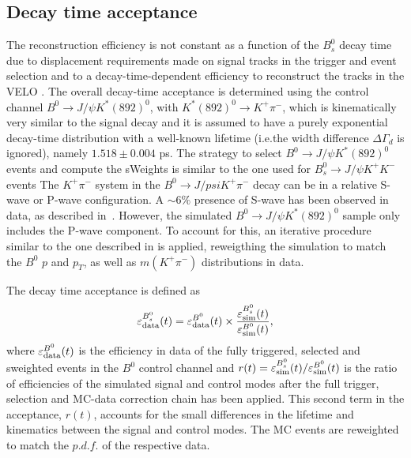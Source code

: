 \subsection{Decay time acceptance} 
The reconstruction efficiency is not constant as a function of the $B^0_s$ decay time due to displacement requirements made on signal tracks in the trigger and event selection and to a decay-time-dependent efficiency to reconstruct the tracks in the VELO \cite{LHCb-PAPER-2013-065}. The overall decay-time acceptance is determined using the control channel $B^0 \to J/\psi K^{*}(892)^0$,
with $K^{*}(892)^0 \to K^+\pi^-$, which is kinematically very similar to the signal decay and it is assumed to have a purely exponential decay-time distribution with a well-known lifetime (i.e.the width difference $\Delta \Gamma_d$ is ignored), namely $1.518\pm 0.004$ ps\cite{HFLAV2017}.
The strategy to select $B^0 \to J/\psi K^{*}(892)^0$ events and compute the sWeights is similar to the one used for $B_s^0 \rightarrow J/\psi K^+ K^-$ events
The $K^+\pi^-$ system in the $B^0 \rightarrow J/psi K^+\pi^-$ decay can be in a relative S-wave or P-wave configuration. A $\sim6\%$ presence of S-wave has been observed in data, as described in~\cite{LHCb-PAPER-2013-023}. However, the simulated $B^0 \rightarrow J/\psi K^{*}(892)^0$ sample only includes the P-wave component. To account for this, an iterative procedure similar to the one described in \red{\ref{subsec:AngAcc}} is applied, reweigthing the simulation to match the $B^0$ $p$ and $p_T$, as well as $m(K^+\pi^-)$ distributions in data. 

The decay time acceptance is defined as
\begin{equation}
	\varepsilon_{\rm data}^{B_s^0}(t) = \varepsilon_{\rm data}^{B^0}(t) \times \frac{\varepsilon_{\rm sim}^{B_s^0}(t)}{\varepsilon_{\rm sim}^{B^0}(t)},
\label{eq:timeacc}
\end{equation}
where $\varepsilon_{\rm data}^{B^0}(t)$ is the efficiency in data of the fully triggered, selected and sweighted events in the $B^0$ control channel and $r(t)=\varepsilon_{\rm sim}^{B_s^0}(t)/\varepsilon_{\rm sim}^{B^0}(t)$ is the ratio of efficiencies of the
simulated signal and control modes after the full trigger, selection and MC-data correction chain has been applied.
This second term in the acceptance, $r(t)$, accounts for the small differences in the lifetime and kinematics between
the signal and control modes. The MC events are reweighted to match the $p.d.f.$ of the respective data.  

